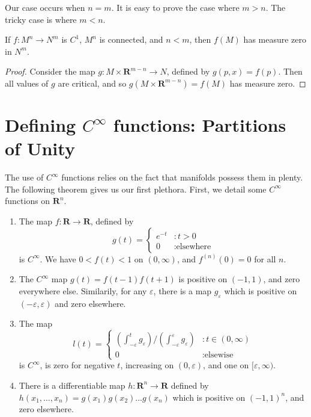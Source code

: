 Our case occurs when $n = m$. It is easy to prove the case where $m > n$. The tricky case is where $m < n$.

\begin{theorem}
    If $f:M^n \to N^m$ is $C^1$, $M^n$ is connected, and $n < m$, then $f(M)$ has measure zero in $N^m$.
\end{theorem}
\begin{proof}
    Consider the map $g: M \times \mathbf{R}^{m-n} \to N$, defined by $g(p,x) = f(p)$. Then all values of $g$ are critical, and so $g(M \times \mathbf{R}^{m-n}) = f(M)$ has measure zero.
\end{proof}

\section{Defining $C^\infty$ functions: Partitions of Unity}

The use of $C^\infty$ functions relies on the fact that manifolds possess them in plenty. The following theorem gives us our first plethora. First, we detail some $C^\infty$ functions on $\mathbf{R}^n$.

\begin{enumerate}
    \item The map $f:\mathbf{R} \to \mathbf{R}$, defined by
    \[
    g(t) =
    \begin{cases}
        e^{-t} & : t > 0\\
        0 & : \text{elsewhere}
    \end{cases}
    \]
    is $C^\infty$. We have $0 < f(t) < 1$ on $(0,\infty)$, and $f^{(n)}(0) = 0$ for all $n$.
    \item The $C^\infty$ map $g(t) = f(t-1)f(t+1)$ is positive on $(-1,1)$, and zero everywhere else. Similarily, for any $\varepsilon$, there is a map $g_\varepsilon$ which is positive on $(-\varepsilon, \varepsilon)$ and zero elsewhere.
    \item The map 
    \[ l(t) = \begin{cases}
        \left(\int_{-\varepsilon}^t g_\varepsilon \right)/\left(\int_{-\varepsilon}^\varepsilon g_\varepsilon \right) & : t \in (0, \infty) \\
        0 & : \text{elsewise}
    \end{cases} \]
    is $C^\infty$, is zero for negative $t$, increasing on $(0, \varepsilon)$, and one on $[\varepsilon, \infty)$.
    \item There is a differentiable map $h:\mathbf{R}^n \to \mathbf{R}$ defined by $h(x_1, \dots, x_n) = g(x_1) g(x_2) \dots g(x_n)$ which is positive on $(-1, 1)^n$, and zero elsewhere.
\end{enumerate}

